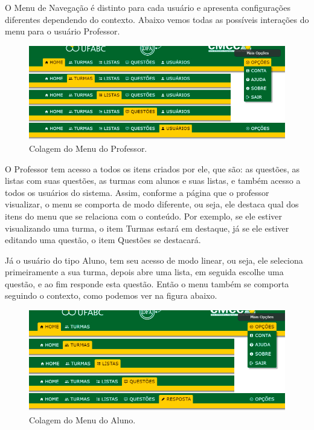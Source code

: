 \documentclass[
	12pt,				%
	openany,
	oneside,
	a4paper,			%
	english,			%
	brazil				%
	]{abntex2}
\begin{document}
    

  
  O Menu de Navegação é distinto para cada usuário e apresenta configurações diferentes dependendo do contexto. Abaixo vemos todas as possíveis interações do menu para o usuário Professor.
  
\begin{figure}[H]
  \centering
  \includegraphics[width=\textwidth]{prints/menuProf.png}
  \caption{Colagem do Menu do Professor.}
  \label{print:menuProf}
  \vspace{-0.5cm}
\end{figure} 
     
  O Professor tem acesso a todos os itens criados por ele, que são: as questões, as listas com suas questões, as turmas com alunos e suas listas, e também acesso a todos os usuários do sistema. Assim, conforme a página que o professor visualizar, o menu se comporta de modo diferente, ou seja, ele destaca qual dos itens do menu que se relaciona com o conteúdo. Por exemplo, se ele estiver visualizando uma turma, o item Turmas estará em destaque, já se ele estiver editando uma questão, o item Questões se destacará.
  
  Já o usuário do tipo Aluno, tem seu acesso de modo linear, ou seja, ele seleciona primeiramente a sua turma, depois abre uma lista, em seguida escolhe uma questão, e ao fim responde esta questão. Então o menu também se comporta seguindo o contexto, como podemos ver na figura abaixo.
  
\begin{figure}[H]
  \centering
  \includegraphics[width=\textwidth]{prints/menuAluno.png}
  \caption{Colagem do Menu do Aluno.}
  \label{print:menuAluno}
  \vspace{-0.5cm}
\end{figure}
\end{document}
